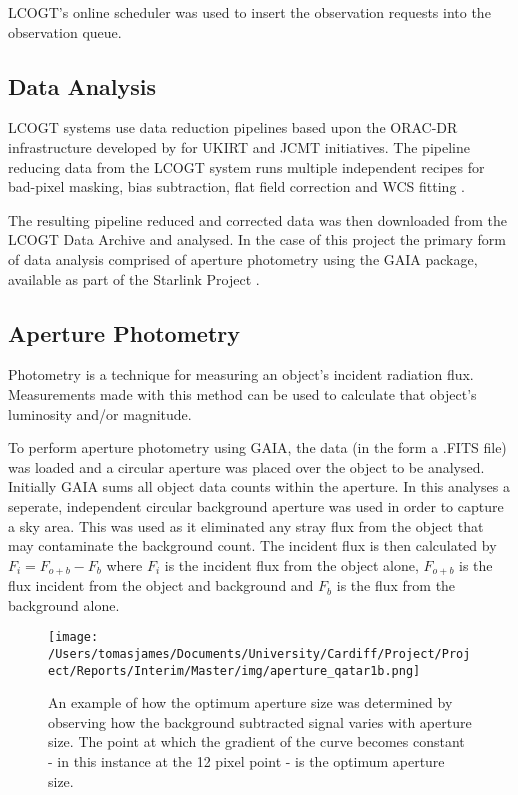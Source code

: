 \documentclass{report}
\begin{document}
LCOGT's online scheduler was used to insert the observation requests into the observation queue.

\subsection{Data Analysis}
LCOGT systems use data reduction pipelines based upon the ORAC-DR infrastructure developed by \textcite{orac-dr} for UKIRT and JCMT initiatives. The pipeline reducing data from the LCOGT system runs multiple independent recipes for bad-pixel masking, bias subtraction, flat field correction and WCS fitting \parencite{pipeline}.  

The resulting pipeline reduced and corrected data was then downloaded from the LCOGT Data Archive and analysed. In the case of this project the primary form of data analysis comprised of aperture photometry using the GAIA package, available as part of the Starlink Project \parencite{starlink}.

\subsection{Aperture Photometry}
Photometry is a technique for measuring an object's incident radiation flux. Measurements made with this method can be used to calculate that object's luminosity and/or magnitude.

To perform aperture photometry using GAIA, the data (in the form a .FITS file) was loaded and a circular aperture was placed over the object to be analysed. Initially GAIA sums all object data counts within the aperture. In this analyses a seperate, independent circular background aperture was used in order to capture a sky area. This was used as it eliminated any stray flux from the object that may contaminate the background count. The incident flux is then calculated by $F_{i} = F_{o+b} - F_{b}$ where $F_{i}$ is the incident flux from the object alone, $F_{o+b}$ is the flux incident from the object and background and $F_{b}$ is the flux from the background alone.

\begin{figure}[H]
\centering
    \texttt{[image: /Users/tomasjames/Documents/University/Cardiff/Project/Project/Reports/Interim/Master/img/aperture\_qatar1b.png]}
\caption[An example of how the optimum aperture size was determined by observing how the background subtracted signal varies with aperture size. The point at which the gradient of the curve becomes constant - in this instance at the 12 pixel point - is the optimum aperture size.]{An example of how the optimum aperture size was determined by observing how the background subtracted signal varies with aperture size. The point at which the gradient of the curve becomes constant - in this instance at the 12 pixel point - is the optimum aperture size.} \label{qatar1b}
\end{figure}
\end{document}
